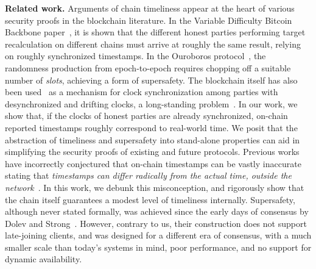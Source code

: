\noindent
\textbf{Related work.}
Arguments of chain timeliness appear at the heart of various security proofs
in the blockchain literature.
In the Variable Difficulty Bitcoin Backbone paper~\cite{varbackbone},
it is shown that the different honest parties performing target recalculation on different chains
must arrive at roughly the same result, relying on roughly synchronized timestamps.
In the Ouroboros protocol~\cite{ouroboros},
the randomness production from epoch-to-epoch requires chopping off a suitable number of \emph{slots},
achieving a form of supersafety. The blockchain itself has also been used~\cite{klepsydra,chronos}
as a mechanism for clock synchronization among parties with desynchronized and drifting clocks,
a long-standing problem~\cite{lamport-synchronizing-clocks}.
In our work, we show that, if the clocks of honest parties are already synchronized,
on-chain reported timestamps roughly correspond to real-world time.
We posit that the abstraction of timeliness and supersafety
into stand-alone properties can aid in simplifying the security proofs
of existing and future protocols.
Previous works have incorrectly conjectured that on-chain timestamps can be vastly
inaccurate stating that \emph{timestamps can differ radically from the
actual time, outside the network}~\cite{szalachowski2018short}.
In this work, we debunk this misconception, and rigorously show that the chain itself
guarantees a modest level of timeliness internally.
Supersafety, although never stated formally, was achieved since the early
days of consensus by Dolev and Strong~\cite{dolev-strong}.
However, contrary to us, their construction does not support late-joining clients,
and was designed for a different era of consensus, with a much smaller scale
than today's systems in mind, poor performance, and no support for dynamic availability.
